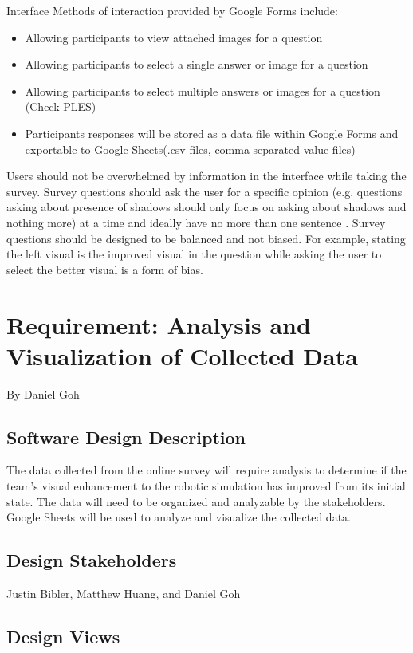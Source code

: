 \documentclass[10pt,journal,compsoc,draftclsnofoot]{IEEEtran}
\makeatletter
\newcommand\subparagraph{%
  \@startsection{subparagraph}{5}
  {\parindent}
  {3.25ex \@plus 1ex \@minus .2ex}
  {0.75ex plus 0.1ex}
  {\normalfont\normalsize\bfseries}}
\makeatother
\begin{document}
\begin{flushleft}
\subparagraph{Interface}
Methods of interaction provided by Google Forms include:
\begin{itemize}
\item Allowing participants to view attached images for a question
\item Allowing participants to select a single answer or image for a question
\item Allowing participants to select multiple answers or images for a question (Check PLES)
\item Participants responses will be stored as a data file within Google Forms and exportable to Google Sheets(.csv files, comma separated value files)
\end{itemize}

Users should not be overwhelmed by information in the interface while taking the survey.
Survey questions should ask the user for a specific opinion (e.g. questions asking about presence of shadows should only focus on asking about shadows and nothing more) at a time and ideally have no more than one sentence \cite{SMquestions}. 
Survey questions should be designed to be balanced and not biased.
For example, stating the left visual is the improved visual in the question while asking the user to select the better visual is a form of bias.  

\newpage

\section{Requirement: Analysis and Visualization of Collected Data}
\large{By Daniel Goh}

\normalsize
\subsection{Software Design Description}
The data collected from the online survey will require analysis to determine if the team's visual enhancement to the robotic simulation has improved from its initial state.
The data will need to be organized and analyzable by the stakeholders.
Google Sheets will be used to analyze and visualize the collected data.

\subsection{Design Stakeholders}
Justin Bibler, Matthew Huang, and Daniel Goh

\subsection{Design Views}

\end{flushleft}
\end{document}
